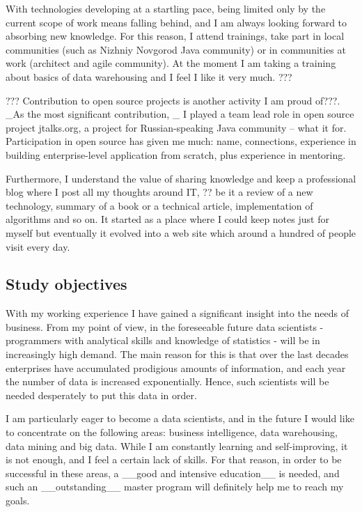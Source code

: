 \documentclass[a4paper,14pt]{extarticle}
\begin{document}
With technologies developing at a startling pace, being limited only by the current scope of work means falling behind, and I am always looking forward to absorbing new knowledge. For this reason, I attend trainings, take part in local communities (such as Nizhniy Novgorod Java community) or in communities at work (architect and agile community). At the moment I am taking a training about basics of data warehousing and I feel I like it very much. ???


???
Contribution to open source projects is another activity I am proud of???. _As the most significant contribution, _ I played a team lead role in open source project jtalks.org, a project for Russian-speaking Java community -- what it for. Participation in open source has given me much: name, connections, experience in building enterprise-level application from scratch, plus experience in mentoring.

Furthermore, I understand the value of sharing knowledge and keep a professional blog where I post all my thoughts around IT, ?? be it a review of a new technology, summary of a book or a technical article, implementation of algorithms and so on. It started as a place where I could keep notes just for myself but eventually it evolved into a web site which around a hundred of people visit every day.


\subsection*{Study objectives}

With my working experience I have gained a significant insight into the needs of business. From my point of view, in the foreseeable future data scientists - programmers with analytical skills and knowledge of statistics - will be in increasingly high demand. The main reason for this is that over the last decades enterprises have accumulated prodigious amounts of information, and each year the number of data is increased exponentially. Hence, such scientists will be needed desperately to put this data in order.

I am particularly eager to become a data scientists, and in the future I would like to concentrate on the following areas: business intelligence, data warehousing, data mining and big data. While I am constantly learning and self-improving, it is not enough, and I feel a certain lack of skills. For that reason, in order to be successful in these areas, a __good and intensive education__ is needed, and such an __outstanding__ master program will definitely help me to reach my goals.
\end{document}
